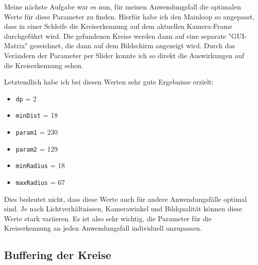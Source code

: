 Meine nächste Aufgabe war es nun, für meinen Anwendungsfall die optimalen Werte für diese Parameter zu finden. Hierfür habe ich den Mainloop so angepasst, dass in einer Schleife die Kreiserkennung auf dem aktuellen Kamera-Frame durchgeführt wird. Die gefundenen Kreise werden dann auf eine separate "GUI-Matrix" gezeichnet, die dann auf dem Bildschirm angezeigt wird. Durch das Verändern der Parameter per Slider konnte ich so direkt die Auswirkungen auf die Kreiserkennung sehen.

Letztendlich habe ich bei diesen Werten sehr gute Ergebnisse erzielt:
\begin{itemize}
    \item \texttt{dp} = 2
    \item \texttt{minDist} = 18
    \item \texttt{param1} = 230
    \item \texttt{param2} = 129
    \item \texttt{minRadius} = 18
    \item \texttt{maxRadius} = 67
\end{itemize}

Dies bedeutet nicht, dass diese Werte auch für andere Anwendungsfälle optimal sind. Je nach Lichtverhältnissen, Kamerawinkel und Bildqualität können diese Werte stark variieren. Es ist also sehr wichtig, die Parameter für die Kreiserkennung an jeden Anwendungsfall individuell anzupassen.

\subsection{Buffering der Kreise}